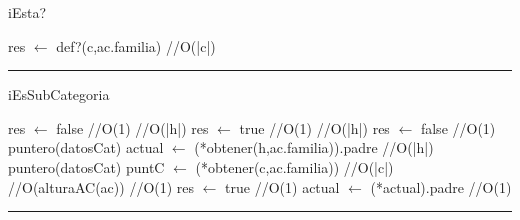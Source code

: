 \begin{algorithm}[H]
\caption{iEsta?}
\begin{algorithmic}[1]
\state res $\gets$ def?(c,ac.familia) \hfill //O(|c|)
\EndFunction 
\end{algorithmic}
\hrule
{}
\end{algorithm}

\begin{algorithm}[H]
\caption{iEsSubCategoria}
\begin{algorithmic}[1]
\state res $\gets$ false \hfill //O(1)
 \hfill //O(|h|)
\state res $\gets$ true \hfill //O(1)
\Else
{} \hfill //O(|h|)
\state res $\gets$ false \hfill //O(1)
\Else
\state puntero(datosCat) actual $\gets$ (*obtener(h,ac.familia)).padre \hfill //O(|h|)
\state puntero(datosCat) puntC $\gets$ (*obtener(c,ac.familia)) \hfill //O(|c|)
 \hfill //O(alturaAC(ac))
 \hfill //O(1)
\state res $\gets$ true \hfill //O(1)
\Else
\state actual $\gets$ (*actual).padre \hfill //O(1)
\endif
\endwhile
\endif
\endif
\EndFunction 
\end{algorithmic}
\hrule
{}
\end{algorithm}
